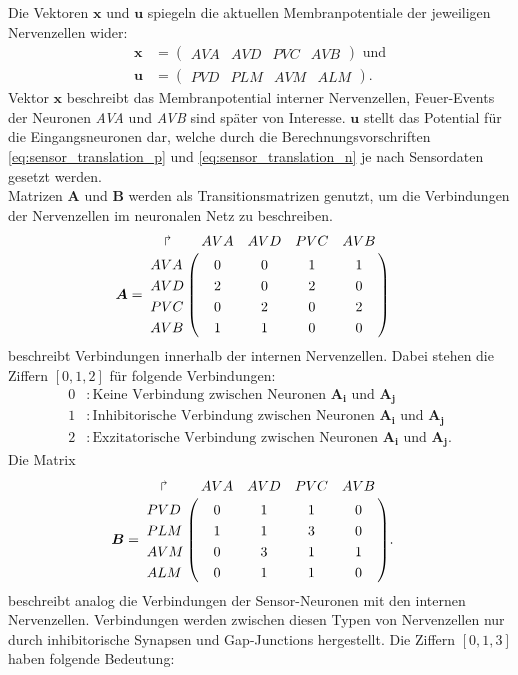 	Die Vektoren $\boldsymbol{x}$ und $\boldsymbol{u}$ spiegeln die aktuellen Membranpotentiale der jeweiligen Nervenzellen wider:
	\begin{align}
		\boldsymbol{x} &= \begin{pmatrix}AVA & AVD & PVC & AVB\end{pmatrix}\text{ und}\\
		\boldsymbol{u} &= \begin{pmatrix}PVD & PLM & AVM & ALM\end{pmatrix}\text{.}
		\label{eq:xu}
	\end{align}
	Vektor $\boldsymbol{x}$ beschreibt das Membranpotential interner Nervenzellen, Feuer-Events der Neuronen \textit{AVA} und \textit{AVB} sind später von Interesse. $\boldsymbol{u}$ stellt das Potential für die Eingangsneuronen dar, welche durch die Berechnungsvorschriften \eqref{eq:sensor_translation_p} und \eqref{eq:sensor_translation_n} je nach Sensordaten gesetzt werden.\\
	Matrizen $\boldsymbol{A}$ und $\boldsymbol{B}$ werden als Transitionsmatrizen genutzt, um die Verbindungen der Nervenzellen im neuronalen Netz zu beschreiben.
	\begin{align}
		\label{eq:mat_A}
		\boldsymbol{A} &= \bordermatrix{
		\quad\Rsh& AVA & AVD & PVC & AVB \cr
			AVA &  0  &  0  &  1  &  1  \cr
			AVD &  2  &  0  &  2  &  0  \cr
			PVC &  0  &  2  &  0  &  2  \cr
			AVB &  1  &  1  &  0  &  0  \cr
		}
	\end{align}
	beschreibt Verbindungen innerhalb der internen Nervenzellen. Dabei stehen die Ziffern $[0,1,2]$ für folgende Verbindungen:
	\begin{align*}
		0 &: \text{Keine Verbindung zwischen Neuronen }\boldsymbol{A_i}\text{ und } \boldsymbol{A_j}\\
		1 &: \text{Inhibitorische Verbindung zwischen Neuronen }\boldsymbol{A_i}\text{ und }\boldsymbol{A_j}\\
		2 &: \text{Exzitatorische Verbindung zwischen Neuronen }\boldsymbol{A_i}\text{ und }\boldsymbol{A_j}.
	\end{align*}
	Die Matrix
	\begin{align}
	\label{eq:mat_B}
	\boldsymbol{B} &= \bordermatrix{
		\quad\Rsh& AVA & AVD & PVC & AVB \cr
			PVD &  0  &  1  &  1  &  0  \cr
			PLM &  1  &  1  &  3  &  0  \cr
			AVM &  0  &  3  &  1  &  1  \cr
			ALM &  0  &  1  &  1  &  0  \cr
		}\text{.}
	\end{align}
	beschreibt analog die Verbindungen der Sensor-Neuronen mit den internen Nervenzellen. Verbindungen werden zwischen diesen Typen von Nervenzellen nur durch inhibitorische Synapsen und Gap-Junctions hergestellt. Die Ziffern $[0,1,3]$ haben folgende Bedeutung:
